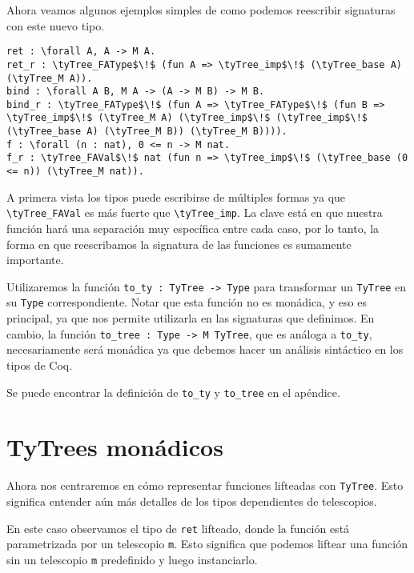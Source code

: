 Ahora veamos algunos ejemplos simples de como podemos reescribir signaturas con este nuevo tipo.

\begin{lstlisting}[frame=tb,caption={Ejemplos de \lstinline{TyTree}},label=lst:exmp_tytree]
ret : \forall A, A -> M A.
ret_r : \tyTree_FAType$\!$ (fun A => \tyTree_imp$\!$ (\tyTree_base A) (\tyTree_M A)).
bind : \forall A B, M A -> (A -> M B) -> M B.
bind_r : \tyTree_FAType$\!$ (fun A => \tyTree_FAType$\!$ (fun B => \tyTree_imp$\!$ (\tyTree_M A) (\tyTree_imp$\!$ (\tyTree_imp$\!$ (\tyTree_base A) (\tyTree_M B)) (\tyTree_M B)))).
f : \forall (n : nat), 0 <= n -> M nat.
f_r : \tyTree_FAVal$\!$ nat (fun n => \tyTree_imp$\!$ (\tyTree_base (0 <= n)) (\tyTree_M nat)).
\end{lstlisting}

A primera vista los tipos puede escribirse de múltiples formas ya que \lstinline{\tyTree_FAVal} es más fuerte que \lstinline{\tyTree_imp}. La clave está en que nuestra función \lift hará una separación muy específica entre cada caso, por lo tanto, la forma en que reescribamos la signatura de las funciones es sumamente importante.

Utilizaremos la función \lstinline{to_ty : TyTree -> Type} para transformar un \lstinline{TyTree} en su \lstinline{Type} correspondiente. Notar que esta función no es monádica, y eso es principal, ya que nos permite utilizarla en las signaturas que definimos. En cambio, la función \lstinline{to_tree : Type -> M TyTree}, que es análoga a \lstinline{to_ty}, necesariamente será monádica ya que debemos hacer un análisis sintáctico en los tipos de Coq.

Se puede encontrar la definición de \lstinline{to_ty} y \lstinline{to_tree} en el apéndice.

\section{TyTrees monádicos}

Ahora nos centraremos en cómo representar funciones lifteadas con \lstinline{TyTree}.
Esto significa entender aún más detalles de los tipos dependientes de telescopios.

En este caso observamos el tipo de \lstinline{ret} lifteado, donde la función está parametrizada por un telescopio \lstinline{m}.
Esto significa que podemos liftear una función sin un telescopio \lstinline{m} predefinido y luego instanciarlo.

